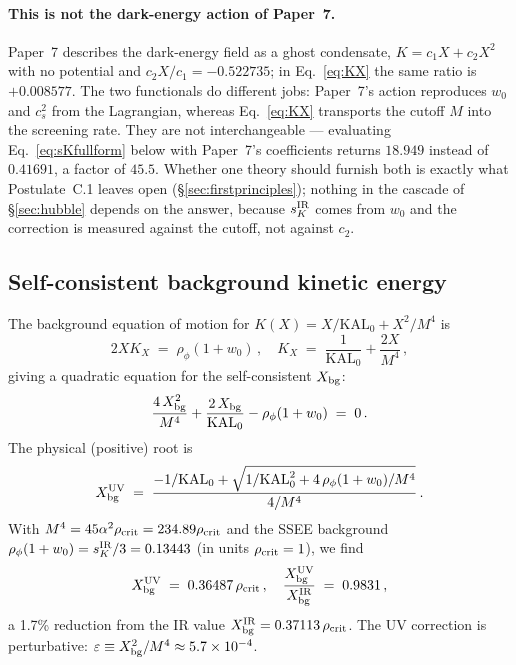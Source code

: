 \documentclass[12pt,a4paper]{article}
\newcommand{\KAL}{\mathrm{KAL}_0}
\newcommand{\sK}{s_K}
\newcommand{\rhoc}{\rho_{\rm crit}}
\begin{document}
\paragraph{This is not the dark-energy action of Paper~7.}
Paper~7 describes the dark-energy field as a ghost condensate,
$K = c_1 X + c_2 X^2$ with no potential and $c_2 X/c_1 = -0.522735$; in
Eq.~\eqref{eq:KX} the same ratio is $+0.008577$. The two functionals do
different jobs: Paper~7's action reproduces $w_0$ and $c_s^2$ from the
Lagrangian, whereas Eq.~\eqref{eq:KX} transports the cutoff $M$ into the
screening rate. They are not interchangeable --- evaluating
Eq.~\eqref{eq:sKfullform} below with Paper~7's coefficients returns
$18.949$ instead of $0.41691$, a factor of $45.5$. Whether one theory
should furnish both is exactly what Postulate~C.1 leaves open
(§\ref{sec:firstprinciples}); nothing in the cascade of
§\ref{sec:hubble} depends on the answer, because $\sK^{\rm IR}$ comes
from $w_0$ and the correction is measured against the cutoff, not
against $c_2$.

\subsection{Self-consistent background kinetic energy}

The background equation of motion for $K(X) = X/\KAL + X^2/M^4$ is
\begin{equation}
  2X K_X \;=\; \rho_\phi(1+w_0)\,,
  \quad
  K_X \;=\; \frac{1}{\KAL} + \frac{2X}{M^4}\,,
\end{equation}
giving a quadratic equation for the self-consistent $X_{\rm bg}$:
\begin{equation}
  \frac{4\,X_{\rm bg}^2}{M^4} + \frac{2\,X_{\rm bg}}{\KAL}
  - \rho_\phi(1+w_0) \;=\; 0\,.
  \label{eq:quadratic}
\end{equation}
The physical (positive) root is
\begin{equation}
  X_{\rm bg}^{\rm UV}
  \;=\; \frac{-1/\KAL + \sqrt{1/\KAL^2 + 4\,\rho_\phi(1+w_0)/M^4}}
             {4/M^4}\,.
\end{equation}
With $M^4 = 45\alpha^2\rhoc = 234.89\rhoc$ and the SSEE background
$\rho_\phi(1+w_0) = \sK^{\rm IR}/3 = 0.13443$ (in units $\rhoc = 1$),
we find
\begin{equation}
  X_{\rm bg}^{\rm UV} \;=\; 0.36487\,\rhoc\,,
  \quad
  \frac{X_{\rm bg}^{\rm UV}}{X_{\rm bg}^{\rm IR}} \;=\; 0.9831\,,
\end{equation}
a 1.7\% reduction from the IR value $X_{\rm bg}^{\rm IR} = 0.37113\,\rhoc$.
The UV correction is perturbative: $\varepsilon \equiv X_{\rm bg}^2/M^4
\approx 5.7\times10^{-4}$.
\end{document}
